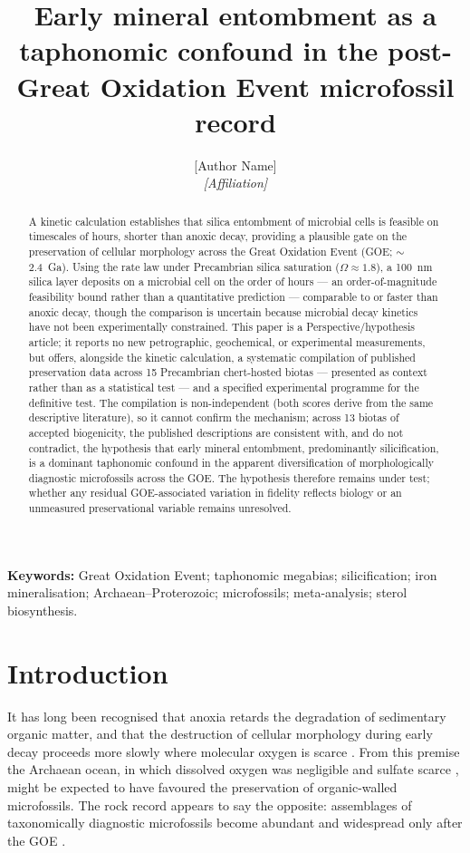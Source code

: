 \documentclass[11pt]{article}
\title{\vspace{-1.0cm}\textbf{Early mineral entombment as a taphonomic confound in the
post-Great Oxidation Event microfossil record}}
\author{[Author Name]\\
\small\textit{[Affiliation]}}
\date{}
\begin{document}
\maketitle

\begin{abstract}
\noindent A kinetic calculation establishes that silica entombment of microbial cells is feasible on
timescales of hours, shorter than anoxic decay, providing a plausible gate on the preservation of
cellular morphology across the Great Oxidation Event (GOE; $\sim$2.4~Ga). Using the \citet{Rimstidt1980}
rate law under Precambrian silica saturation ($\Omega \approx 1.8$), a 100~nm silica layer deposits on a
microbial cell on the order of hours --- an order-of-magnitude feasibility bound rather than a
quantitative prediction --- comparable to or faster than anoxic decay, though the comparison is uncertain
because microbial decay kinetics have not been experimentally constrained. This paper is a
Perspective/hypothesis article; it reports no new petrographic, geochemical, or experimental
measurements, but offers, alongside the kinetic calculation, a systematic compilation of published
preservation data across 15 Precambrian chert-hosted biotas --- presented as context rather than as a
statistical test --- and a specified experimental programme for the definitive test. The compilation is
non-independent (both scores derive from the same descriptive literature), so it cannot confirm the
mechanism; across 13 biotas of accepted biogenicity, the published descriptions are consistent with, and
do not contradict, the hypothesis that early mineral entombment, predominantly silicification, is a
dominant taphonomic confound in the apparent diversification of morphologically diagnostic microfossils
across the GOE. The hypothesis therefore remains under test; whether any residual GOE-associated
variation in fidelity reflects biology or an unmeasured preservational variable remains unresolved.
\end{abstract}

\noindent\textbf{Keywords:} Great Oxidation Event; taphonomic megabias; silicification; iron
mineralisation; Archaean--Proterozoic; microfossils; meta-analysis; sterol biosynthesis.

\section{Introduction}

It has long been recognised that anoxia retards the degradation of sedimentary organic matter, and
that the destruction of cellular morphology during early decay proceeds more slowly where molecular
oxygen is scarce \citep{Canfield1994,Hedges1995}. From this premise the Archaean ocean, in which
dissolved oxygen was negligible \citep{Pavlov2002} and sulfate scarce \citep{Habicht2002,Crowe2014},
might be expected to have favoured the preservation of organic-walled microfossils. The rock record
appears to say the opposite: assemblages of taxonomically diagnostic microfossils become abundant
and widespread only after the GOE \citep{Javaux2018,Wacey2014}.
\end{document}
